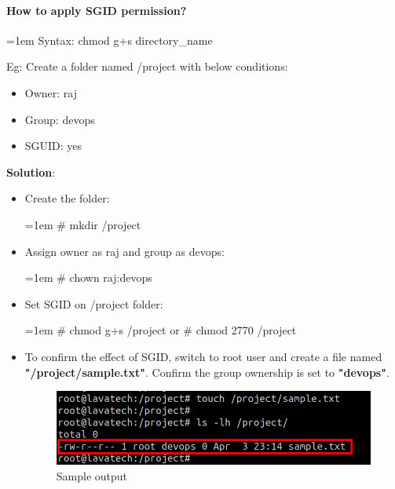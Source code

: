 \begin{flushleft}
	\paragraph{How to apply SGID permission?}
	\begin{tcolorbox}[breakable,notitle,boxrule=0pt,colback=pink,colframe=pink]
		\color{black}
		\font=1em
		Syntax: chmod g+s directory\_name
		\font=4pt
	\end{tcolorbox}
	Eg: Create a folder named /project with below conditions:
	\begin{itemize}
		\item Owner: raj
		\item Group: devops
		\item SGUID: yes
	\end{itemize}
	\textbf{Solution}:
	\begin{itemize}
		\item Create the folder:
		\begin{tcolorbox}[breakable,notitle,boxrule=-0pt,colback=black,colframe=black]
			\color{green}
			\font=1em
			\# mkdir /project
			\font=4pt
		\end{tcolorbox}
		\item Assign owner as raj and group as devops:
		\begin{tcolorbox}[breakable,notitle,boxrule=-0pt,colback=black,colframe=black]
			\color{green}
			\font=1em
			\# chown raj:devops
			\font=4pt
		\end{tcolorbox}
		\item Set SGID on /project folder:
		\begin{tcolorbox}[breakable,notitle,boxrule=-0pt,colback=black,colframe=black]
			\color{green}
			\font=1em
			\# chmod g+s /project
			\newline
			or
			\newline
			\# chmod 2770 /project
			\font=4pt
		\end{tcolorbox}
		\item To confirm the effect of SGID, switch to root user and create a file named \textbf{"/project/sample.txt"}. Confirm the group ownership is set to \textbf{"devops"}.
		\begin{figure}[h!]
			\centering
			\includegraphics[scale=0.5]{content/chapter6/images/123.png}
			\caption{Sample output}
			\label{fig:combination_permission41}
		\end{figure}
	\end{itemize}
	\newpage

\end{flushleft}
